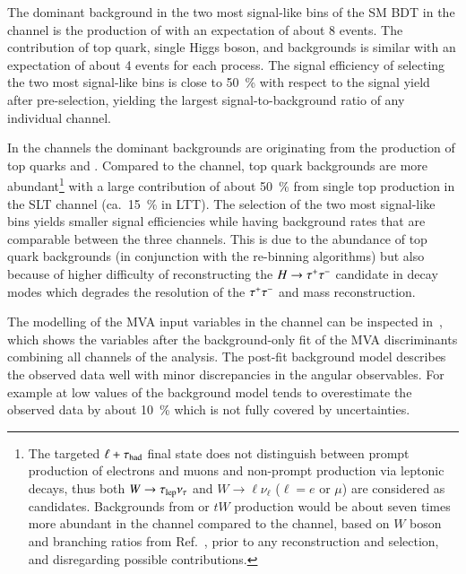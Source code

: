 The dominant background in the two most signal-like bins of the SM \HH
BDT in the \hadhad channel is the production of \ZHF with an
expectation of about 8 events. The contribution of top quark, single
Higgs boson, and \faketauhadvis backgrounds is similar with an
expectation of about 4 events for each process. The signal efficiency
of selecting the two most signal-like bins is close to
\SI{50}{\percent} with respect to the signal yield after
pre-selection, yielding the largest signal-to-background ratio of any
individual channel.

In the \lephad channels the dominant backgrounds are originating from
the production of top quarks and \ZHF. Compared to the \hadhad
channel, top quark backgrounds are more abundant\footnote{The targeted
  $\ell + \tau_{\text{had}}$ final state does not distinguish between prompt
  production of electrons and muons and non-prompt production via
  leptonic \taulepton decays, thus both $W \to \tau_{\text{lep}} \nu_{\tau}$ and
  $W \to \ell \nu_{\ell}$ ($\ell = e$ or $\mu$) are considered as
  \taulepvis candidates. Backgrounds from \ttbar or $tW$ production
  would be about seven times more abundant in the \lephad channel
  compared to the \hadhad channel, based on $W$ boson and \taulepton
  branching ratios from Ref.~\cite{pdg2020}, prior to any
  reconstruction and selection, and disregarding possible
  \faketauhadvis contributions.}  with a large contribution of about
\SI{50}{\percent} from single top production in the SLT channel (ca.\
\SI{15}{\percent} in LTT). The selection of the two most signal-like
bins yields smaller signal efficiencies while having background rates
that are comparable between the three channels. This is due to the
abundance of top quark backgrounds (in conjunction with the re-binning
algorithms) but also because of higher difficulty of reconstructing
the $H \to \tau^{+} \tau^{-}$ candidate in \lephad decay modes which degrades
the resolution of the $\tau^{+} \tau^{-}$ and \HH mass reconstruction.

The modelling of the MVA input variables in the \hadhad channel can be
inspected in~\Cref{fig:postfit_mva_inputs}, which shows the variables
after the background-only fit of the MVA discriminants combining all
channels of the analysis. The post-fit background model describes the
observed data well with minor discrepancies in the angular
observables. For example at low values of \dRtautau the background
model tends to overestimate the observed data by about
\SI{10}{\percent} which is not fully covered by uncertainties.

